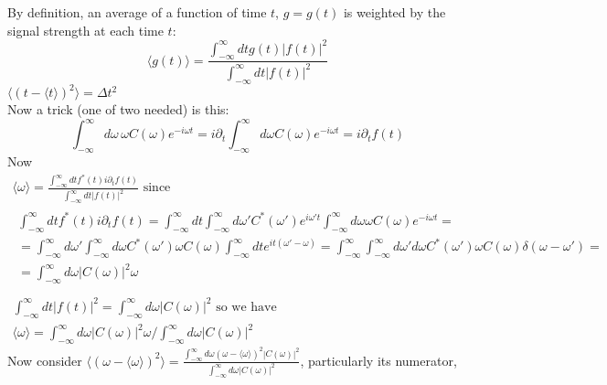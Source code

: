 \documentclass[twoside, 10pt]{amsart}
\begin{document}
By definition, an average of a function of time $t$, $g= g(t)$ is weighted by the signal strength at each time $t$:
\[
\langle g(t) \rangle = \frac{ \int_{-\infty}^{\infty} dt g(t) |f(t)|^2 }{ \int_{-\infty}^{\infty} dt |f(t)|^2 }
\]
$\langle (t-\langle t \rangle )^2 \rangle = \Delta t^2$ \smallskip \\
Now a trick (one of two needed) is this:
\[
\int_{-\infty}^{\infty} d\omega \, \omega C(\omega) e^{-i\omega t} = i \partial_t \int_{-\infty}^{\infty} d\omega C(\omega) e^{-i\omega t} = i \partial_t f(t) 
\]
Now 
\[
\begin{gathered}
  \langle \omega \rangle = \frac{ \int_{-\infty}^{\infty} dt f^*(t) i \partial_t f(t) }{ \int_{-\infty}^{\infty} dt |f(t)|^2 } \text{ since } \\
  \begin{gathered}
    \int_{-\infty}^{\infty} dt f^*(t) i \partial_t f(t) = \int_{-\infty}^{\infty} dt \int_{-\infty}^{\infty} d\omega' C^*(\omega')e^{ i \omega't } \int_{-\infty}^{\infty} d\omega \omega C(\omega) e^{-i\omega t} = \\
    = \int_{-\infty}^{\infty} d\omega' \int_{-\infty}^{\infty} d \omega C^*(\omega')\omega C(\omega) \int_{-\infty}^{\infty} dt e^{it(\omega'-\omega) }  = \int_{-\infty}^{\infty} \int_{-\infty}^{\infty} d\omega' d\omega C^*(\omega')\omega C(\omega) \delta(\omega-\omega') = \\ 
    = \int_{-\infty}^{\infty} d\omega |C(\omega)|^2 \omega 
\end{gathered} \\
  \quad \\
\int_{-\infty}^{\infty} dt |f(t)|^2 =\int_{-\infty}^{\infty} d\omega |C(\omega)|^2  \text{ so we have } \\
\langle \omega \rangle = \int_{-\infty}^{\infty} d\omega |C(\omega)|^2 \omega / \int_{-\infty}^{\infty} d\omega |C(\omega)|^2 
\end{gathered}
\]
Now consider $\langle (\omega - \langle \omega \rangle )^2 \rangle = \frac{ \int_{-\infty}^{\infty} d\omega ( \omega - \langle \omega \rangle )^2 |C(\omega)|^2 }{ \int_{-\infty}^{\infty} d\omega | C(\omega)|^2 } $, particularly its numerator,
\end{document}
